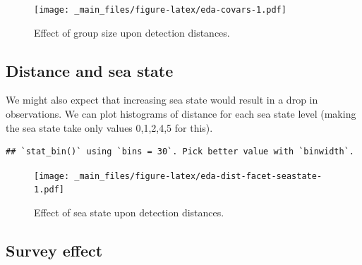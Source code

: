 \documentclass[]{book}
\newenvironment{Shaded}{\begin{snugshade}}{\end{snugshade}}
\newcommand{\KeywordTok}[1]{\textcolor[rgb]{0.13,0.29,0.53}{\textbf{#1}}}
\newcommand{\DataTypeTok}[1]{\textcolor[rgb]{0.13,0.29,0.53}{#1}}
\newcommand{\DecValTok}[1]{\textcolor[rgb]{0.00,0.00,0.81}{#1}}
\newcommand{\StringTok}[1]{\textcolor[rgb]{0.31,0.60,0.02}{#1}}
\newcommand{\OtherTok}[1]{\textcolor[rgb]{0.56,0.35,0.01}{#1}}
\newcommand{\OperatorTok}[1]{\textcolor[rgb]{0.81,0.36,0.00}{\textbf{#1}}}
\newcommand{\NormalTok}[1]{#1}
\theoremstyle{definition}
\theoremstyle{definition}
\theoremstyle{remark}
\begin{document}
\begin{figure}
\centering
\texttt{[image: \_main\_files/figure-latex/eda-covars-1.pdf]}
\caption{\label{fig:eda-covars}Effect of group size upon detection
distances.}
\end{figure}

\subsection{Distance and sea state}\label{distance-and-sea-state}

We might also expect that increasing sea state would result in a drop in
observations. We can plot histograms of distance for each sea state
level (making the sea state take only values 0,1,2,4,5 for this).

\begin{Shaded}
\end{Shaded}

\begin{verbatim}
## `stat_bin()` using `bins = 30`. Pick better value with `binwidth`.
\end{verbatim}

\begin{figure}
\centering
\texttt{[image: \_main\_files/figure-latex/eda-dist-facet-seastate-1.pdf]}
\caption{\label{fig:eda-dist-facet-seastate}Effect of sea state upon
detection distances.}
\end{figure}

\subsection{Survey effect}\label{survey-effect}
\end{document}
